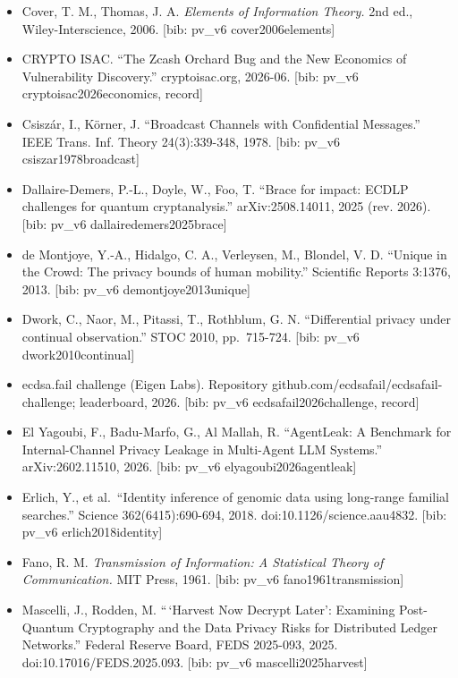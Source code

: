 \documentclass[
  11pt,
]{article}
\begin{document}
\begin{itemize}
  pp.~384-415. {[}bib: pv\_v6 chevignard2025reducing{]}
\item
  Cover, T. M., Thomas, J. A. \emph{Elements of Information Theory.} 2nd
  ed., Wiley-Interscience, 2006. {[}bib: pv\_v6 cover2006elements{]}
\item
  CRYPTO ISAC. ``The Zcash Orchard Bug and the New Economics of
  Vulnerability Discovery.'' cryptoisac.org, 2026-06. {[}bib: pv\_v6
  cryptoisac2026economics, record{]}
\item
  Csiszár, I., Körner, J. ``Broadcast Channels with Confidential
  Messages.'' IEEE Trans. Inf. Theory 24(3):339-348, 1978. {[}bib:
  pv\_v6 csiszar1978broadcast{]}
\item
  Dallaire-Demers, P.-L., Doyle, W., Foo, T. ``Brace for impact: ECDLP
  challenges for quantum cryptanalysis.'' arXiv:2508.14011, 2025 (rev.
  2026). {[}bib: pv\_v6 dallairedemers2025brace{]}
\item
  de Montjoye, Y.-A., Hidalgo, C. A., Verleysen, M., Blondel, V. D.
  ``Unique in the Crowd: The privacy bounds of human mobility.''
  Scientific Reports 3:1376, 2013. {[}bib: pv\_v6
  demontjoye2013unique{]}
\item
  Dwork, C., Naor, M., Pitassi, T., Rothblum, G. N. ``Differential
  privacy under continual observation.'' STOC 2010, pp.~715-724. {[}bib:
  pv\_v6 dwork2010continual{]}
\item
  ecdsa.fail challenge (Eigen Labs). Repository
  github.com/ecdsafail/ecdsafail-challenge; leaderboard, 2026. {[}bib:
  pv\_v6 ecdsafail2026challenge, record{]}
\item
  El Yagoubi, F., Badu-Marfo, G., Al Mallah, R. ``AgentLeak: A Benchmark
  for Internal-Channel Privacy Leakage in Multi-Agent LLM Systems.''
  arXiv:2602.11510, 2026. {[}bib: pv\_v6 elyagoubi2026agentleak{]}
\item
  Erlich, Y., et al.~``Identity inference of genomic data using
  long-range familial searches.'' Science 362(6415):690-694, 2018.
  doi:10.1126/science.aau4832. {[}bib: pv\_v6 erlich2018identity{]}
\item
  Fano, R. M. \emph{Transmission of Information: A Statistical Theory of
  Communication.} MIT Press, 1961. {[}bib: pv\_v6
  fano1961transmission{]}
\item
  Mascelli, J., Rodden, M. ``\,`Harvest Now Decrypt Later': Examining
  Post-Quantum Cryptography and the Data Privacy Risks for Distributed
  Ledger Networks.'' Federal Reserve Board, FEDS 2025-093, 2025.
  doi:10.17016/FEDS.2025.093. {[}bib: pv\_v6 mascelli2025harvest{]}

\end{itemize}
\end{document}
